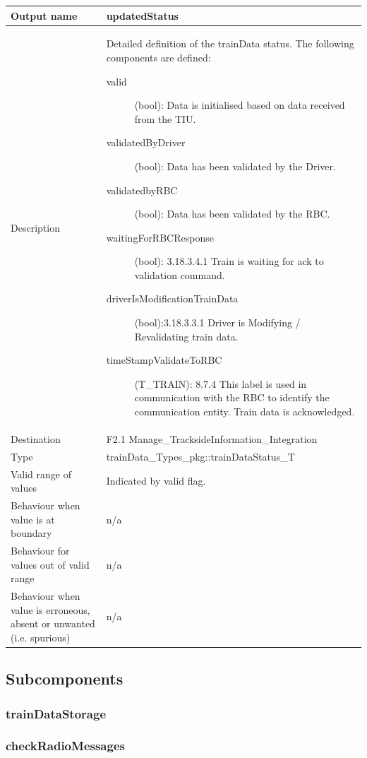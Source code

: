 \begin{longtable}{p{}p{}}
\toprule
Output name				& updatedStatus \\
\midrule
Description				& Detailed definition of the trainData status. The following components are defined:
\begin{description}
\item[valid](bool): Data is initialised based on data received from the TIU.
\item[validatedByDriver](bool): Data has been validated by the Driver.
\item[validatedbyRBC](bool): Data has been validated by the RBC.
\item[waitingForRBCResponse](bool): 3.18.3.4.1 Train is waiting for ack to validation command.
\item[driverIsModificationTrainData](bool):3.18.3.3.1 Driver is Modifying / Revalidating train data.
\item[timeStampValidateToRBC](T\_TRAIN): 8.7.4 This label is used in communication with the RBC to identify the communication entity. Train data is acknowledged.
\end{description} 
\\
\midrule
Destination				& F2.1 Manage\_TracksideInformation\_Integration\\  
\midrule
Type					& trainData\_Types\_pkg::trainDataStatus\_T \\
\midrule
Valid range of values	& Indicated by valid flag. \\
\midrule
Behaviour when value is at boundary	& n/a\\
\midrule
Behaviour for values out of valid range	& n/a \\
\midrule
Behaviour when value is erroneous, absent or unwanted (i.e. spurious) & n/a\\
\bottomrule
\end{longtable}



\subsection{Subcomponents}\label{s:traindata_subcomponents}

\subsubsection{trainDataStorage}


\subsubsection{checkRadioMessages}


